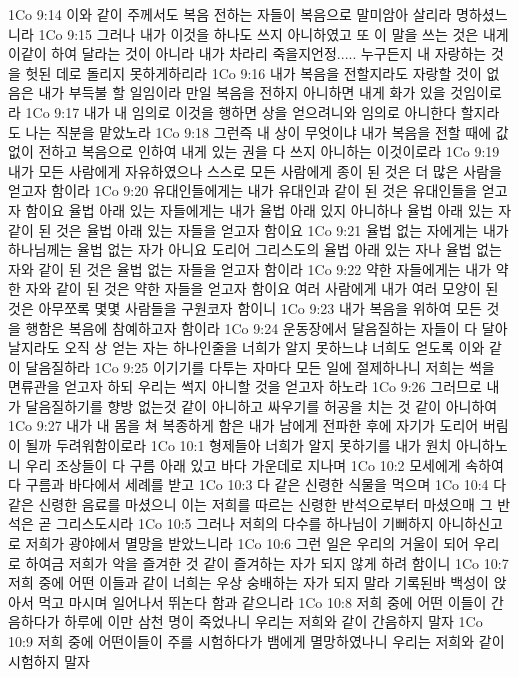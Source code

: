 1Co 9:14  이와 같이 주께서도 복음 전하는 자들이 복음으로 말미암아 살리라 명하셨느니라
1Co 9:15  그러나 내가 이것을 하나도 쓰지 아니하였고 또 이 말을 쓰는 것은 내게 이같이 하여 달라는 것이 아니라 내가 차라리 죽을지언정..... 누구든지 내 자랑하는 것을 헛된 데로 돌리지 못하게하리라
1Co 9:16  내가 복음을 전할지라도 자랑할 것이 없음은 내가 부득불 할 일임이라 만일 복음을 전하지 아니하면 내게 화가 있을 것임이로라
1Co 9:17  내가 내 임의로 이것을 행하면 상을 얻으려니와 임의로 아니한다 할지라도 나는 직분을 맡았노라
1Co 9:18  그런즉 내 상이 무엇이냐 내가 복음을 전할 때에 값 없이 전하고 복음으로 인하여 내게 있는 권을 다 쓰지 아니하는 이것이로라
1Co 9:19  내가 모든 사람에게 자유하였으나 스스로 모든 사람에게 종이 된 것은 더 많은 사람을 얻고자 함이라
1Co 9:20  유대인들에게는 내가 유대인과 같이 된 것은 유대인들을 얻고자 함이요 율법 아래 있는 자들에게는 내가 율법 아래 있지 아니하나 율법 아래 있는 자 같이 된 것은 율법 아래 있는 자들을 얻고자 함이요
1Co 9:21  율법 없는 자에게는 내가 하나님께는 율법 없는 자가 아니요 도리어 그리스도의 율법 아래 있는 자나 율법 없는 자와 같이 된 것은 율법 없는 자들을 얻고자 함이라
1Co 9:22  약한 자들에게는 내가 약한 자와 같이 된 것은 약한 자들을 얻고자 함이요 여러 사람에게 내가 여러 모양이 된 것은 아무쪼록 몇몇 사람들을 구원코자 함이니
1Co 9:23  내가 복음을 위하여 모든 것을 행함은 복음에 참예하고자 함이라
1Co 9:24  운동장에서 달음질하는 자들이 다 달아날지라도 오직 상 얻는 자는 하나인줄을 너희가 알지 못하느냐 너희도 얻도록 이와 같이 달음질하라
1Co 9:25  이기기를 다투는 자마다 모든 일에 절제하나니 저희는 썩을 면류관을 얻고자 하되 우리는 썩지 아니할 것을 얻고자 하노라
1Co 9:26  그러므로 내가 달음질하기를 향방 없는것 같이 아니하고 싸우기를 허공을 치는 것 같이 아니하여
1Co 9:27  내가 내 몸을 쳐 복종하게 함은 내가 남에게 전파한 후에 자기가 도리어 버림이 될까 두려워함이로라
1Co 10:1  형제들아 너희가 알지 못하기를 내가 원치 아니하노니 우리 조상들이 다 구름 아래 있고 바다 가운데로 지나며
1Co 10:2  모세에게 속하여 다 구름과 바다에서 세례를 받고
1Co 10:3  다 같은 신령한 식물을 먹으며
1Co 10:4  다 같은 신령한 음료를 마셨으니 이는 저희를 따르는 신령한 반석으로부터 마셨으매 그 반석은 곧 그리스도시라
1Co 10:5  그러나 저희의 다수를 하나님이 기뻐하지 아니하신고로 저희가 광야에서 멸망을 받았느니라
1Co 10:6  그런 일은 우리의 거울이 되어 우리로 하여금 저희가 악을 즐겨한 것 같이 즐겨하는 자가 되지 않게 하려 함이니
1Co 10:7  저희 중에 어떤 이들과 같이 너희는 우상 숭배하는 자가 되지 말라 기록된바 백성이 앉아서 먹고 마시며 일어나서 뛰논다 함과 같으니라
1Co 10:8  저희 중에 어떤 이들이 간음하다가 하루에 이만 삼천 명이 죽었나니 우리는 저희와 같이 간음하지 말자
1Co 10:9  저희 중에 어떤이들이 주를 시험하다가 뱀에게 멸망하였나니 우리는 저희와 같이 시험하지 말자

